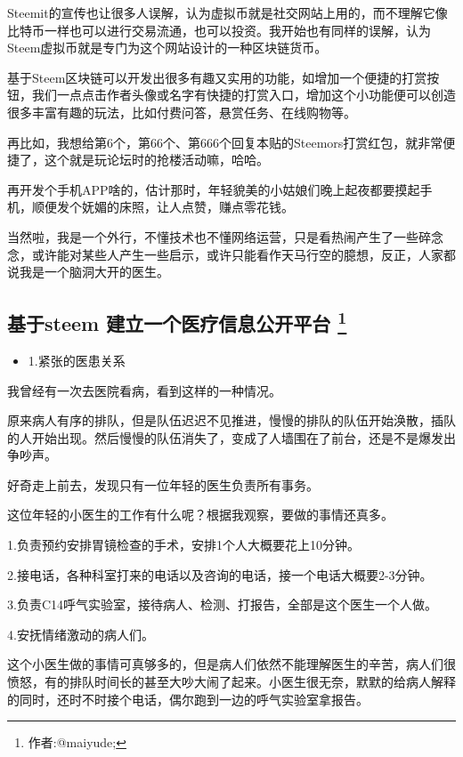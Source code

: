 \documentclass[]{ctexbook}
\providecommand{\tightlist}{%
  \setlength{\itemsep}{0pt}\setlength{\parskip}{0pt}}
\begin{document}
Steemit的宣传也让很多人误解，认为虚拟币就是社交网站上用的，而不理解它像比特币一样也可以进行交易流通，也可以投资。我开始也有同样的误解，认为Steem虚拟币就是专门为这个网站设计的一种区块链货币。

基于Steem区块链可以开发出很多有趣又实用的功能，如增加一个便捷的打赏按钮，我们一点点击作者头像或名字有快捷的打赏入口，增加这个小功能便可以创造很多丰富有趣的玩法，比如付费问答，悬赏任务、在线购物等。

再比如，我想给第6个，第66个、第666个回复本贴的Steemors打赏红包，就非常便捷了，这个就是玩论坛时的抢楼活动嘛，哈哈。

再开发个手机APP啥的，估计那时，年轻貌美的小姑娘们晚上起夜都要摸起手机，顺便发个妩媚的床照，让人点赞，赚点零花钱。

当然啦，我是一个外行，不懂技术也不懂网络运营，只是看热闹产生了一些碎念念，或许能对某些人产生一些启示，或许只能看作天马行空的臆想，反正，人家都说我是一个脑洞大开的医生。

\hypertarget{steem-}{%
\subsection[基于steem 建立一个医疗信息公开平台 ]{\texorpdfstring{基于steem 建立一个医疗信息公开平台 \footnote{作者:@maiyude;}}{基于steem 建立一个医疗信息公开平台 }}\label{steem-}}

\begin{itemize}
\tightlist
\item
  1.紧张的医患关系
\end{itemize}

我曾经有一次去医院看病，看到这样的一种情况。

原来病人有序的排队，但是队伍迟迟不见推进，慢慢的排队的队伍开始涣散，插队的人开始出现。然后慢慢的队伍消失了，变成了人墙围在了前台，还是不是爆发出争吵声。

好奇走上前去，发现只有一位年轻的医生负责所有事务。

这位年轻的小医生的工作有什么呢？根据我观察，要做的事情还真多。

1.负责预约安排胃镜检查的手术，安排1个人大概要花上10分钟。

2.接电话，各种科室打来的电话以及咨询的电话，接一个电话大概要2-3分钟。

3.负责C14呼气实验室，接待病人、检测、打报告，全部是这个医生一个人做。

4.安抚情绪激动的病人们。

这个小医生做的事情可真够多的，但是病人们依然不能理解医生的辛苦，病人们很愤怒，有的排队时间长的甚至大吵大闹了起来。小医生很无奈，默默的给病人解释的同时，还时不时接个电话，偶尔跑到一边的呼气实验室拿报告。
\end{document}
